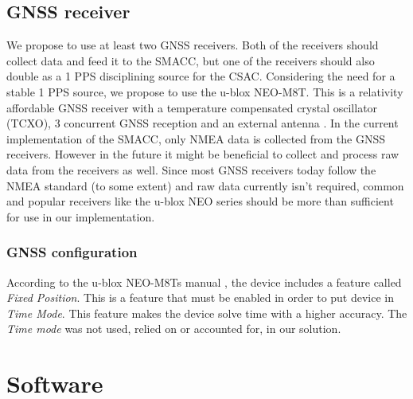 \documentclass[12pt,english,a4paper]{report}
\begin{document}
\section{GNSS receiver}
We propose to use at least two GNSS receivers. Both of the receivers should collect data and feed it to the SMACC, but one of the receivers should also double as a 1 PPS disciplining source for the CSAC. Considering the need for a stable 1 PPS source, we propose to use the u-blox NEO-M8T. This is a relativity affordable GNSS receiver with a temperature compensated crystal oscillator (TCXO), 3 concurrent GNSS reception and an external antenna \cite{UBLOXM8T}. In the current implementation of the SMACC, only NMEA data is collected from the GNSS receivers. However in the future it might be beneficial to collect and process raw data from the receivers as well. Since most GNSS receivers today follow the NMEA standard (to some extent) and raw data currently isn't required, common and popular receivers like the u-blox NEO series should be more than sufficient for use in our implementation.

\subsection{GNSS configuration}
According to the u-blox NEO-M8Ts manual \cite{UBLOXM8TMANUAL}, the device includes a feature called \textit{Fixed Position}. This is a feature that must be enabled in order to put device in \textit{Time Mode}. This feature makes the device solve time with a higher accuracy. The \textit{Time mode} was not used, relied on or accounted for, in our solution. 

\chapter{Software}
\end{document}
